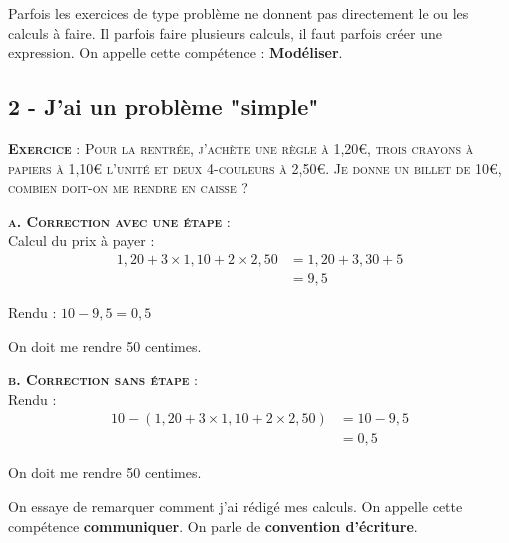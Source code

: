 \documentclass[11pt]{article}
\begin{document}
Parfois les exercices de type problème ne donnent pas directement le ou les calculs à faire. Il parfois faire plusieurs calculs, il faut parfois créer une expression. On appelle cette compétence : \textbf{Modéliser}.\\

\subsection*{2 - J'ai un problème "simple"}

\textsc{\textbf{Exercice} : Pour la rentrée, j'achète une règle à 1,20€, trois crayons à papiers à 1,10€ l'unité et deux 4-couleurs à 2,50€.} \newline
\textsc{Je donne un billet de 10€, combien doit-on me rendre en caisse ?}\\

\begin{minipage}[t]{0.5\textwidth}
\textsc{\textbf{a. Correction avec une étape} :}\\

Calcul du prix à payer :
\begin{align*}
1,20 + 3 \times 1,10 + 2 \times 2,50 &= 1,20 + 3,30 + 5 \\
                                     &= 9,5
\end{align*}

Rendu : $10 - 9,5 = 0,5$

On doit me rendre 50 centimes.\\

\end{minipage}\begin{minipage}[t]{0.5\textwidth}
\textsc{\textbf{b. Correction sans étape} :}\\

Rendu :
\begin{align*}
10 - (1,20 + 3 \times 1,10 + 2 \times 2,50) &= 10 - 9,5 \\
                                            &= 0,5
\end{align*}

On doit me rendre 50 centimes. \\
\end{minipage}

On essaye de remarquer comment j’ai rédigé mes calculs. On appelle cette compétence \textbf{communiquer}. On parle de \textbf{convention d'écriture}.
\end{document}
